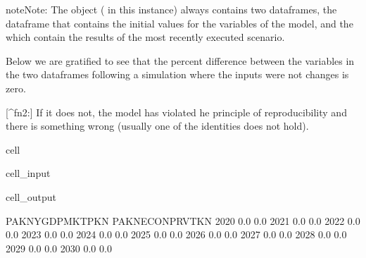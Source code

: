\documentclass[letterpaper,10pt,english]{jupyterBook}
\begin{document}
\begin{sphinxadmonition}{note}{Note:}
\sphinxAtStartPar
The  object ( in this instance) always contains two dataframes, the  dataframe that contains the initial values for the variables of the model, and the  which contain the results of the most recently executed scenario.
\end{sphinxadmonition}

\sphinxAtStartPar
Below we are gratified to see that the percent difference between the variables in the two dataframes following a simulation where the inputs were not changes is zero.

\sphinxAtStartPar
{[}\textasciicircum{}fn2:{]} If it does not, the model has violated he principle of reproducibility and there is something wrong (usually one of the identities does not hold).

\begin{sphinxuseclass}{cell}\begin{sphinxVerbatimInput}

\begin{sphinxuseclass}{cell_input}
\begin{sphinxVerbatim}[commandchars=\\\{\}]
\PYG{p}{[}\PYG{p}{]}
\end{sphinxVerbatim}

\end{sphinxuseclass}\end{sphinxVerbatimInput}
\begin{sphinxVerbatimOutput}

\begin{sphinxuseclass}{cell_output}
\begin{sphinxVerbatim}[commandchars=\\\{\}]
      PAKNYGDPMKTPKN  PAKNECONPRVTKN
2020             0.0             0.0
2021             0.0             0.0
2022             0.0             0.0
2023             0.0             0.0
2024             0.0             0.0
2025             0.0             0.0
2026             0.0             0.0
2027             0.0             0.0
2028             0.0             0.0
2029             0.0             0.0
2030             0.0             0.0
\end{sphinxVerbatim}

\end{sphinxuseclass}\end{sphinxVerbatimOutput}

\end{sphinxuseclass}
\end{document}
